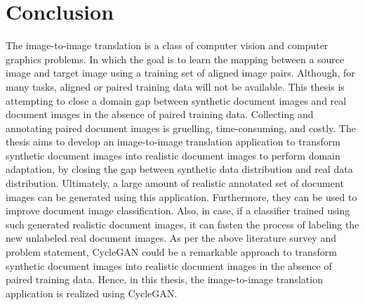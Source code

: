 \section{Conclusion}\label{rwconclusion}

The image-to-image translation is a class of computer vision and computer graphics problems. In which the goal is to learn the mapping between a source image and target image using a training set of aligned image pairs. Although, for many tasks, aligned or paired training data will not be available. This thesis is attempting to close a domain gap between synthetic document images and real document images in the absence of paired training data. Collecting and annotating paired document images is gruelling, time-consuming, and costly. The thesis aims to develop an image-to-image translation application to transform synthetic document images into realistic document images to perform domain adaptation, by closing the gap between synthetic data distribution and real data distribution. Ultimately, a large amount of realistic annotated set of document images can be generated using this application. Furthermore, they can be used to improve document image classification. Also, in case, if a classifier trained using such generated realistic document images, it can fasten the process of labeling the new unlabeled real document images. As per the above literature survey \cite{zhu2020unpaired} \cite{sharma2019learning} and problem statement, \ac{CycleGAN} could be a remarkable approach to transform synthetic document images into realistic document images in the absence of paired training data. Hence, in this thesis, the image-to-image translation application is realized using \ac{CycleGAN}.








